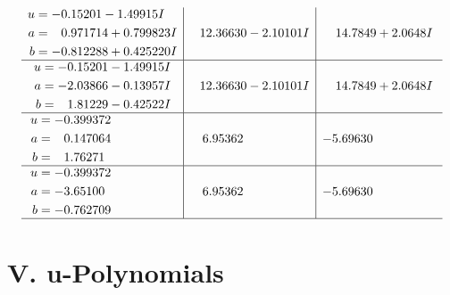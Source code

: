 \documentclass[1p]{elsarticle_modified}
\theoremstyle{definition}
\begin{document}
$$\begin{array}{c|c|c}
\begin{aligned}
u &= -0.15201 - 1.49915 I \\
a &= \phantom{-}0.971714 + 0.799823 I \\
b &= -0.812288 + 0.425220 I\end{aligned}
 & \phantom{-}12.36630 - 2.10101 I & \phantom{-}14.7849 + 2.0648 I \\ \hline\begin{aligned}
u &= -0.15201 - 1.49915 I \\
a &= -2.03866 - 0.13957 I \\
b &= \phantom{-}1.81229 - 0.42522 I\end{aligned}
 & \phantom{-}12.36630 - 2.10101 I & \phantom{-}14.7849 + 2.0648 I \\ \hline\begin{aligned}
u &= -0.399372\phantom{ +0.000000I} \\
a &= \phantom{-}0.147064\phantom{ +0.000000I} \\
b &= \phantom{-}1.76271\phantom{ +0.000000I}\end{aligned}
 & \phantom{-}6.95362\phantom{ +0.000000I} & -5.69630\phantom{ +0.000000I} \\ \hline\begin{aligned}
u &= -0.399372\phantom{ +0.000000I} \\
a &= -3.65100\phantom{ +0.000000I} \\
b &= -0.762709\phantom{ +0.000000I}\end{aligned}
 & \phantom{-}6.95362\phantom{ +0.000000I} & -5.69630\phantom{ +0.000000I}\\
 \hline 
 \end{array}$$\newpage
\newpage\renewcommand{\arraystretch}{1}
\centering \section*{ V. u-Polynomials}
\end{document}

